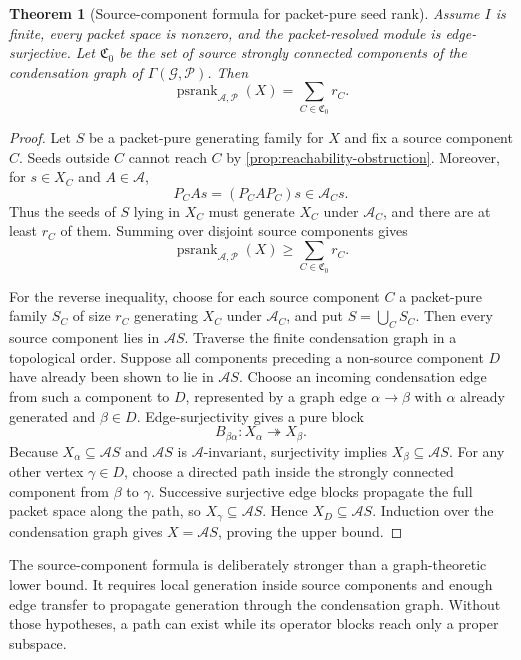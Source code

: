 \documentclass[11pt]{article}
\newtheorem{theorem}{Theorem}[section]
\theoremstyle{definition}
\theoremstyle{remark}
\theoremstyle{definition}\newtheorem{example}[theorem]{Example}
\newcommand{\A}{\mathcal A}
\newcommand{\Pcal}{\mathcal P}
\newcommand{\psrank}{\operatorname{psrank}}
\newcommand{\RecordID}[1]{\label{record:#1}}
\newcommand{\Depends}[1]{}
\newcommand{\Exports}[1]{}
\begin{document}
\begin{theorem}[Source-component formula for packet-pure seed rank]
\label{thm:source-component-rank}
Assume $I$ is finite, every packet space is nonzero, and the packet-resolved module is edge-surjective.  Let $\mathfrak C_0$ be the set of source strongly connected components of the condensation graph of $\Gamma(\mathcal G,\Pcal)$.  Then
\[
\boxed{
\psrank_{\A,\Pcal}(X)
=
\sum_{C\in\mathfrak C_0}r_C.
}
\]
\end{theorem}
\RecordID{PSC-I-T-SOURCE-COMPONENT-SEED-RANK}
\Depends{PSC-I-P-REACHABILITY-OBSTRUCTION and PSC-I-D-EDGE-SURJECTIVE.}
\Exports{Residual transport forests and directed source-rank calculations.}

\begin{proof}
Let $S$ be a packet-pure generating family for $X$ and fix a source component $C$.  Seeds outside $C$ cannot reach $C$ by \cref{prop:reachability-obstruction}.  Moreover, for $s\in X_C$ and $A\in\A$,
\[
P_CAs=(P_CAP_C)s\in\A_Cs.
\]
Thus the seeds of $S$ lying in $X_C$ must generate $X_C$ under $\A_C$, and there are at least $r_C$ of them.  Summing over disjoint source components gives
\[
\psrank_{\A,\Pcal}(X)
\geq
\sum_{C\in\mathfrak C_0}r_C.
\]

For the reverse inequality, choose for each source component $C$ a packet-pure family $S_C$ of size $r_C$ generating $X_C$ under $\A_C$, and put $S=\bigcup_CS_C$.  Then every source component lies in $\A S$.  Traverse the finite condensation graph in a topological order.  Suppose all components preceding a non-source component $D$ have already been shown to lie in $\A S$.  Choose an incoming condensation edge from such a component to $D$, represented by a graph edge $\alpha\to\beta$ with $\alpha$ already generated and $\beta\in D$.  Edge-surjectivity gives a pure block
\[
B_{\beta\alpha}:X_\alpha\twoheadrightarrow X_\beta.
\]
Because $X_\alpha\subseteq\A S$ and $\A S$ is $\A$-invariant, surjectivity implies $X_\beta\subseteq\A S$.  For any other vertex $\gamma\in D$, choose a directed path inside the strongly connected component from $\beta$ to $\gamma$.  Successive surjective edge blocks propagate the full packet space along the path, so $X_\gamma\subseteq\A S$.  Hence $X_D\subseteq\A S$.  Induction over the condensation graph gives $X=\A S$, proving the upper bound.
\end{proof}

\begin{hypothesisguide}
The source-component formula is deliberately stronger than a graph-theoretic lower bound.  It requires local generation inside source components and enough edge transfer to propagate generation through the condensation graph.  Without those hypotheses, a path can exist while its operator blocks reach only a proper subspace.
\end{hypothesisguide}
\end{document}
